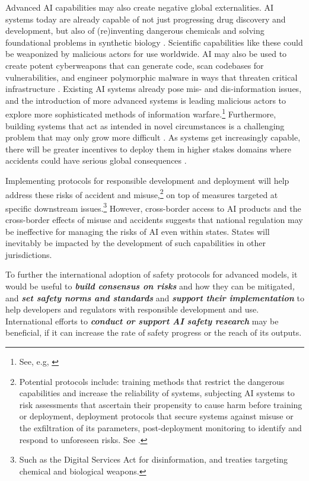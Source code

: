 \documentclass[12pt]{article}
\begin{document}
Advanced AI capabilities may also create negative global externalities.
AI systems today are already capable of not just progressing drug
discovery and development, but also of (re)inventing dangerous
chemicals \cite{urbina_dual_2022} and solving foundational problems in synthetic biology \cite{jumper_highly_2021}.
Scientific capabilities like these could be weaponized by malicious
actors for use worldwide.
AI may also be used to create potent cyberweapons that can generate
code, scan codebases for vulnerabilities,
and engineer polymorphic malware in ways that threaten critical
infrastructure \cite{steinhart_what_2023, shimony_chatting_2023}.
Existing AI systems already pose mis- and dis-information issues, and
the introduction of more advanced systems is leading malicious actors to
explore more sophisticated methods of information warfare.\footnote{See, e.g,
\cite{bond_fake_2023, goldstein_generative_2023}}
Furthermore, building systems that act as intended in novel
circumstances is a challenging problem that may only grow more
difficult \cite{hendrycks_unsolved_2022, amodei_concrete_2016}.
As systems get increasingly capable, there will be greater incentives to
deploy them in higher stakes domains where accidents could have serious
global consequences \cite{arnold_ai_2021, noauthor_statement_2023}.

Implementing protocols for responsible development and deployment will
help address these risks of accident and misuse,\footnote{Potential
protocols include: training methods that restrict the dangerous
capabilities and increase the reliability of systems, subjecting AI
systems to risk assessments that ascertain their propensity to cause
harm before training or deployment, deployment protocols that secure
systems against misuse or the exfiltration of its parameters,
post-deployment monitoring to identify and respond to unforeseen
risks. See \cite{anderljung_frontier_2023}.} on top of measures
targeted at specific downstream issues.\footnote{Such as the Digital
Services Act for disinformation, and treaties targeting chemical and
biological weapons.} However, cross-border access to AI products and
the cross-border effects of misuse and accidents suggests that national
regulation may be ineffective for managing the risks of AI even within
states. States will inevitably be impacted by the development of such
capabilities in other jurisdictions.

To further the international adoption of safety protocols for advanced models, it would be
useful to \emph{\textbf{build consensus on risks}} and how they can be
mitigated\emph{,} and \emph{\textbf{set safety norms and standards}} and
\emph{\textbf{support their implementation}} to help developers and
regulators with responsible development and use. International efforts
to \emph{\textbf{conduct or support AI safety research}} may be
beneficial, if it can increase the rate of safety progress or the reach
of its outputs.
\end{document}
